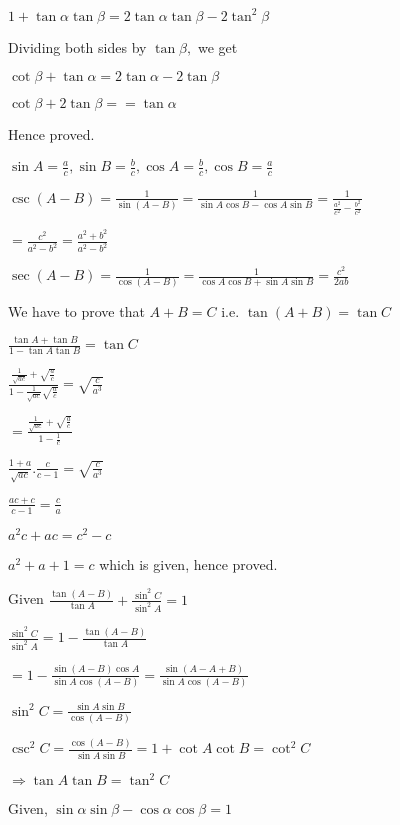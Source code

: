   $1 + \tan\alpha\tan\beta = 2\tan\alpha\tan\beta - 2\tan^2\beta$

  Dividing both sides by $\tan\beta,$ we get

  $\cot \beta + \tan\alpha = 2\tan\alpha - 2\tan\beta$

  $\cot\beta + 2\tan\beta = =\tan\alpha$

  Hence proved.

\item $\sin A = \frac{a}{c}, \sin B = \frac{b}{c}, \cos A = \frac{b}{c}, \cos B = \frac{a}{c}$

  $\csc(A - B) = \frac{1}{\sin(A - B)} = \frac{1}{\sin A\cos B - \cos A\sin B} = \frac{1}{\frac{a^2}{c^2} -
  \frac{b^2}{c^2}}$

  $= \frac{c^2}{a^2 - b^2} = \frac{a^2 + b^2}{a^2 - b^2}$

  $\sec(A - B) = \frac{1}{\cos(A - B)} = \frac{1}{\cos A\cos B + \sin A\sin B} = \frac{c^2}{2ab}$

\item We have to prove that $A + B = C$ i.e. $\tan(A + B) = \tan C$

  $\frac{\tan A + \tan B}{1 - \tan A\tan B} = \tan C$

  $\frac{\frac{1}{\sqrt{ac}} + \sqrt{\frac{a}{c}}}{1 - \frac{1}{\sqrt{ac}}\sqrt{\frac{a}{c}}} = \sqrt{\frac{c}{a^3}}$

  $= \frac{\frac{1}{\sqrt{ac}} + \sqrt{\frac{a}{c}}}{1 - \frac{1}{c}}$

  $\frac{1 + a}{\sqrt{ac}}.\frac{c}{c - 1} = \sqrt{\frac{c}{a^3}}$

  $\frac{ac + c}{c - 1} = \frac{c}{a}$

  $a^2c + ac = c^2 - c$

  $a^2 + a + 1 = c$ which is given, hence proved.

\item Given $\frac{\tan(A - B)}{\tan A} + \frac{\sin^2C}{\sin^2A} = 1$

  $\frac{\sin^2C}{\sin^2A} = 1 - \frac{\tan(A - B)}{\tan A}$

  $= 1 - \frac{\sin(A - B)\cos A}{\sin A\cos(A - B)} = \frac{\sin (A - A + B)}{\sin A\cos(A - B)}$

  $\sin^2C = \frac{\sin A\sin B}{\cos(A - B)}$

  $\csc^2C = \frac{\cos(A - B)}{\sin A\sin B} = 1 + \cot A\cot B = \cot^2C$

  $\Rightarrow \tan A\tan B= \tan^2 C$

\item Given, $\sin\alpha\sin\beta - \cos\alpha\cos\beta = 1$


